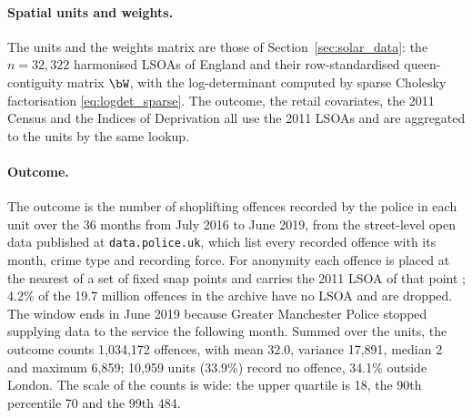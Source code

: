 \paragraph{Spatial units and weights.}
The units and the weights matrix are those of Section~\ref{sec:solar_data}: the $n = 32{,}322$ harmonised LSOAs of England and their row-standardised queen-contiguity matrix $\bW$, with the log-determinant computed by sparse Cholesky factorisation \eqref{eq:logdet_sparse}.
The outcome, the retail covariates, the 2011 Census and the Indices of Deprivation all use the 2011 LSOAs and are aggregated to the units by the same lookup.

\paragraph{Outcome.}
The outcome is the number of shoplifting offences recorded by the police in each unit over the 36 months from July 2016 to June 2019, from the street-level open data published at \texttt{data.police.uk}, which list every recorded offence with its month, crime type and recording force.
For anonymity each offence is placed at the nearest of a set of fixed snap points and carries the 2011 LSOA of that point \citep{tompson2015}; 4.2\% of the 19.7 million offences in the archive have no LSOA and are dropped.
The window ends in June 2019 because Greater Manchester Police stopped supplying data to the service the following month.
Summed over the units, the outcome counts 1{,}034{,}172 offences, with mean 32.0, variance 17{,}891, median 2 and maximum 6{,}859; 10{,}959 units (33.9\%) record no offence, 34.1\% outside London.
The scale of the counts is wide: the upper quartile is 18, the 90th percentile 70 and the 99th 484.

